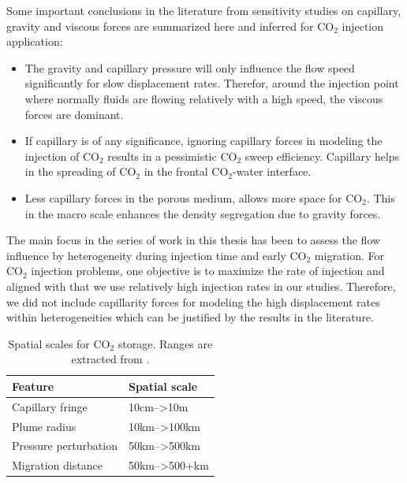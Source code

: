 Some important conclusions in the literature from sensitivity studies on
capillary, gravity and viscous forces are summarized here and inferred for
$\mbox{CO}_2$ injection application:

\begin{itemize}
 \item The gravity and capillary pressure will only influence the flow speed
significantly for slow displacement rates. Therefor, around the injection point
where normally fluids are flowing relatively with a high speed, the viscous
forces
are dominant.
 
 \item If capillary is of any significance, ignoring capillary forces in
modeling the injection of $\mbox{CO}_2$ results in a pessimistic $\mbox{CO}_2$
sweep efficiency. Capillary helps in the spreading of $\mbox{CO}_2$ in the
frontal $\mbox{CO}_2$-water interface.
 
 \item Less capillary forces in the porous medium, allows more space for
$\mbox{CO}_2$. This in the macro scale enhances the density segregation due to
gravity forces.
\end{itemize}

The main focus in the series of work in this thesis has been to assess the flow
influence by heterogeneity during injection time and early $\mbox{CO}_2$
migration. For $\mbox{CO}_2$ injection problems, one objective is to maximize
the rate of injection and aligned with that we use relatively high injection
rates in our studies. Therefore, we did not include capillarity forces for
modeling the high displacement rates within heterogeneities which can be
justified by the results in the literature.


\begin{table}[tbf]
  \center
  \begin{tabular}{ |l|| l| }
    \hline
    Feature& Spatial scale \\
    \hline
    Capillary fringe & 10cm-->10m\\
    \hline
    Plume radius & 10km-->100km\\
    \hline
    Pressure perturbation & 50km-->500km\\
    \hline
    Migration distance & 50km-->500+km\\
    \hline
  \end{tabular}
  \caption{Spatial scales for $\mbox{CO}_2$ storage. Ranges are extracted from
\cite{celia2011geological}.}
  \label{tab:xscl}
\end{table}


